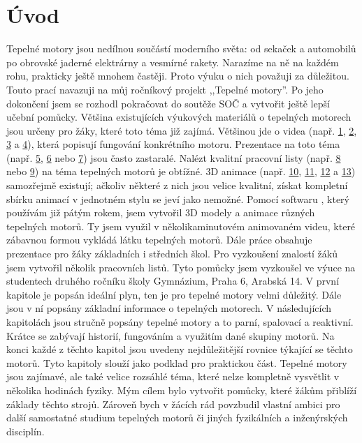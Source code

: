 \section{Úvod}
{Tepelné motory jsou nedílnou součástí moderního světa: od sekaček a automobilů po obrovské jaderné elektrárny a vesmírné rakety. Narazíme na ně na každém rohu, prakticky ještě mnohem častěji. Proto výuku o nich považuji za důležitou. Touto prací navazuji na můj ročníkový projekt ,,Tepelné motory”. Po jeho dokončení jsem se rozhodl pokračovat do soutěže SOČ a vytvořit ještě lepší učební pomůcky.}\odst
{Většina existujících výukových materiálů o tepelných motorech jsou určeny pro žáky, které toto téma již zajímá. Většinou jde o videa (např. \href{https://www.youtube.com/watch?v=k9DhdvbmRiw}{1}, \href{https://www.youtube.com/watch?v=dR1pyp3q9Ko}{2}, \href{https://www.youtube.com/watch?v=eP8nWqcWmAc}{3} a \href{https://www.youtube.com/watch?v=Fpbg1jUh36M}{4}), která popisují fungování konkrétního motoru. Prezentace na toto téma (např. \href{https://zs-nucice.cz/UserFiles/File/eu_new_361-400/VY_32_INOVACE_374.pdf}{5}, \href{https://view.officeapps.live.com/op/view.aspx?src=http://dumy.cz/nahled/73077}{6} nebo \href{https://slideplayer.cz/slide/12677857/}{7}) jsou často zastaralé. Nalézt kvalitní pracovní listy (např. \href{https://view.officeapps.live.com/op/view.aspx?src=http://dumy.cz/nahled/117673}{8} nebo \href{https://www.soshlinky.cz/documents/uploads/71\%20Motory.xlsx}{9}) na téma tepelných motorů je obtížné. 3D animace (např. \href{https://www.youtube.com/watch?v=kWRRHRWuduk}{10}, \href{https://www.youtube.com/watch?v=ZQvfHyfgBtA&t=26s}{11}, \href{https://www.youtube.com/watch?v=MUxP3PCDRTE}{12} a \href{https://www.youtube.com/watch?v=Iiu3UyxLEHk}{13}) samozřejmě existují; ačkoliv některé z nich jsou velice kvalitní, získat kompletní sbírku animací v jednotném stylu se jeví jako nemožné.}\odst
{Pomocí softwaru , který používám již pátým rokem, jsem vytvořil 3D modely a animace různých tepelných motorů. Ty jsem využil v několikaminutovém animovaném videu, které zábavnou formou vykládá látku tepelných motorů. Dále práce obsahuje prezentace pro žáky základních i středních škol. Pro vyzkoušení znalostí žáků jsem vytvořil několik pracovních listů. Tyto pomůcky jsem vyzkoušel ve výuce na studentech druhého ročníku školy Gymnázium, Praha 6, Arabská 14.}\odst
{V první kapitole je popsán ideální plyn, ten je pro tepelné motory velmi důležitý. Dále jsou v ní popsány základní informace o tepelných motorech. V následujících kapitolách jsou stručně popsány tepelné motory a to parní, spalovací a reaktivní. Krátce se zabývají historií, fungováním a využitím dané skupiny motorů. Na konci každé z těchto kapitol jsou uvedeny nejdůležitější rovnice týkající se těchto motorů. Tyto kapitoly slouží jako podklad pro praktickou část.}\odst
{Tepelné motory jsou zajímavé, ale také velice rozsáhlé téma, které nelze kompletně vysvětlit v několika hodinách fyziky. Mým cílem bylo vytvořit pomůcky, které žákům přiblíží základy těchto strojů. Zároveň bych v žácích rád povzbudil vlastní ambici pro další samostatné studium tepelných motorů či jiných fyzikálních a inženýrských disciplín.}